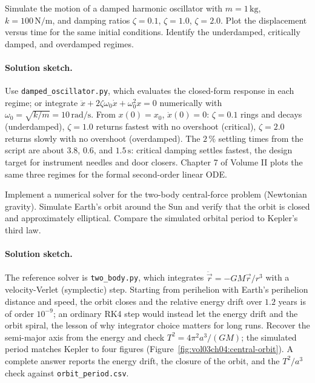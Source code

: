 \begin{exercise}
Simulate the motion of a damped harmonic oscillator with $m =
1\,\si{\kilogram}$, $k = 100\,\si{\newton\per\meter}$, and damping
ratios $\zeta = 0.1$, $\zeta = 1.0$, $\zeta = 2.0$. Plot the
displacement versus time for the same initial conditions. Identify
the underdamped, critically damped, and overdamped regimes.
\paragraph{Solution sketch.} Use \texttt{damped\_oscillator.py},
which evaluates the closed-form response in each regime; or integrate
$\ddot{x}+2\zeta\omega_{0}\dot{x}+\omega_{0}^{2}x=0$ numerically with
$\omega_{0}=\sqrt{k/m}=10\,\si{\radian\per\second}$. From $x(0)=x_{0}$,
$\dot{x}(0)=0$: $\zeta=0.1$ rings and decays (underdamped),
$\zeta=1.0$ returns fastest with no overshoot (critical), $\zeta=2.0$
returns slowly with no overshoot (overdamped). The $2\,\%$ settling
times from the script are about $3.8$, $0.6$, and $1.5\,\si{\second}$:
critical damping settles fastest, the design target for instrument
needles and door closers. Chapter 7 of Volume II plots the same three
regimes for the formal second-order linear ODE.
\end{exercise}

\begin{exercise}
Implement a numerical solver for the two-body central-force problem
(Newtonian gravity). Simulate Earth's orbit around the Sun and
verify that the orbit is closed and approximately elliptical.
Compare the simulated orbital period to Kepler's third law.
\paragraph{Solution sketch.} The reference solver is
\texttt{two\_body.py}, which integrates $\ddot{\vec{r}}=-GM\vec{r}/
r^{3}$ with a velocity-Verlet (symplectic) step. Starting from
perihelion with Earth's perihelion distance and speed, the orbit
closes and the relative energy drift over $1.2$ years is of order
$10^{-9}$; an ordinary RK4 step would instead let the energy drift and
the orbit spiral, the lesson of why integrator choice matters for
long runs. Recover the semi-major axis from the energy and check
$T^{2}=4\pi^{2}a^{3}/(GM)$; the simulated period matches Kepler to
four figures (Figure~\ref{fig:vol03ch04:central-orbit}). A complete
answer reports the energy drift, the closure of the orbit, and the
$T^{2}/a^{3}$ check against \texttt{orbit\_period.csv}.
\end{exercise}


